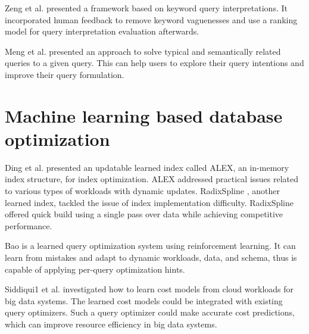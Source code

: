  Zeng et al. \cite{zeng2012isearch} presented a framework based on keyword query interpretations. It incorporated human feedback to remove keyword vaguenesses and use a ranking model for query interpretation evaluation afterwards.

 Meng et al. \cite{meng2017top} presented an approach to solve typical and semantically related queries to a given query. This can help users to explore their query intentions and improve their query formulation.



\section{Machine learning based database optimization}

 Ding et al. \cite{ding2020alex} presented an updatable learned index called ALEX, an in-memory index structure, for index optimization. ALEX addressed practical issues related to various types of workloads with dynamic updates. RadixSpline \cite{kipf2020radixspline}, another learned index, tackled the issue of index implementation difficulty. RadixSpline offered quick build using a single pass over data while achieving competitive performance.

 Bao \cite{marcus2022bao} is a learned query optimization system using reinforcement learning. It can learn from mistakes and adapt to dynamic workloads, data, and schema, thus is capable of applying per-query optimization hints.

 Siddiqui1 et al. \cite{siddiqui2020cost} investigated how to learn cost models from cloud workloads for big data systems. The learned cost models could be integrated with existing query optimizers. Such a query optimizer could make accurate cost predictions, which can improve resource efficiency in big data systems.
